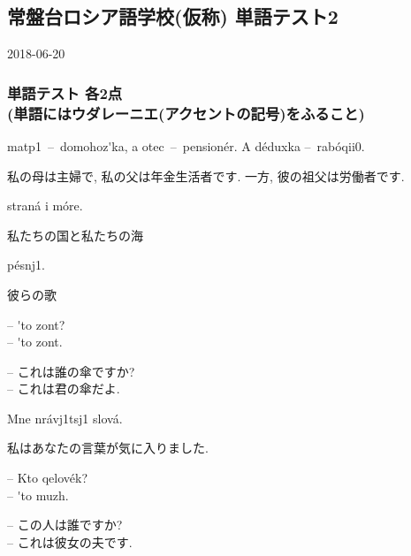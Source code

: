 \documentclass[11pt]{jsarticle}
\begin{document}
\subsection*{常盤台ロシア語学校(仮称) 単語テスト2}
\begin{flushright}
  2018-06-20
\end{flushright}
\subsubsection*{単語テスト 各2点\\(単語にはウダレーニエ(アクセントの記号)をふること)}
\begin{multicolpar}{2}
\underline{\phantom{Моя}} mat{p1}\ \---\ domohoz\'ka, a \underline{\phantom{мой}} otec\ \---\ pension\'er. A \underline{\phantom{его}} d\'eduxka \---\ rab\'oqi{i0}.

私の母は主婦で, 私の父は年金生活者です. 一方, 彼の祖父は労働者です.\\
\end{multicolpar}
\begin{multicolpar}{2}
\underline{\phantom{Наша}} stran\'a i \underline{\phantom{наше}} m\'ore.

私たちの国と私たちの海
\end{multicolpar}
\begin{multicolpar}{2}
\underline{\phantom{Их}} p\'esn{j1}.

彼らの歌
\end{multicolpar}
\begin{multicolpar}{2}
\--- \underline{\phantom{Чей}} \'\cyrerev to zont?\\
\--- \'\CYREREV to \underline{\phantom{твой}} zont.

\noindent
\--- これは誰の傘ですか?\\
\--- これは君の傘だよ.\\
\end{multicolpar}
\begin{multicolpar}{2}
Mne nr\'av{j1}{t}s{j1} \underline{\phantom{ваши}} slov\'a.

私はあなたの言葉が気に入りました.
\end{multicolpar}
\begin{multicolpar}{2}
\--- Kto \underline{\phantom{этот}} qelov\'ek?\\
\--- \'\CYREREV to \underline{\phantom{её}} mu{zh}.

\noindent
\--- この人は誰ですか?\\
\--- これは彼女の夫です.
\end{multicolpar}
\end{document}
